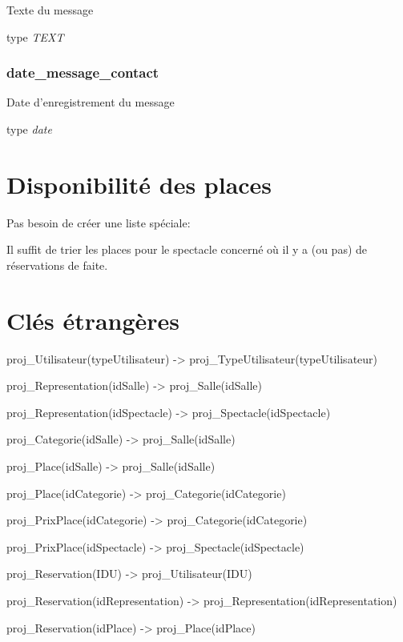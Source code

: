Texte du message

type \emph{TEXT}

\subsubsection{date\_message\_contact}\label{dateux5fmessageux5fcontact}

Date d'enregistrement du message

type \emph{date}

\section{Disponibilité des places}\label{disponibilituxe9-des-places}

Pas besoin de créer une liste spéciale:

Il suffit de trier les places pour le spectacle concerné où il y a (ou
pas) de réservations de faite.

\section{Clés étrangères}\label{cluxe9s-uxe9tranguxe8res}

proj\_Utilisateur(typeUtilisateur) -\textgreater{}
proj\_TypeUtilisateur(typeUtilisateur)

proj\_Representation(idSalle) -\textgreater{} proj\_Salle(idSalle)

proj\_Representation(idSpectacle) -\textgreater{}
proj\_Spectacle(idSpectacle)

proj\_Categorie(idSalle) -\textgreater{} proj\_Salle(idSalle)

proj\_Place(idSalle) -\textgreater{} proj\_Salle(idSalle)

proj\_Place(idCategorie) -\textgreater{} proj\_Categorie(idCategorie)

proj\_PrixPlace(idCategorie) -\textgreater{}
proj\_Categorie(idCategorie)

proj\_PrixPlace(idSpectacle) -\textgreater{}
proj\_Spectacle(idSpectacle)

proj\_Reservation(IDU) -\textgreater{} proj\_Utilisateur(IDU)

proj\_Reservation(idRepresentation) -\textgreater{}
proj\_Representation(idRepresentation)

proj\_Reservation(idPlace) -\textgreater{} proj\_Place(idPlace)
